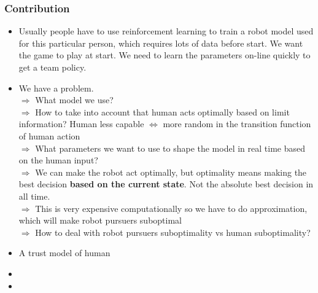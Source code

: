 \subsubsection{Contribution}
\begin{itemize}
    \item Usually people have to use reinforcement learning to train a robot model used for this particular person, which requires lots of data before start. We want the game to play at start. We need to learn the parameters on-line quickly to get a team policy.
    \item We have a problem.\\
    $\Rightarrow$ What model we use?\\
    $\Rightarrow$ How to take into account that human acts optimally based on limit information? Human less capable $\Leftrightarrow$ more random in the transition function of human action\\
    $\Rightarrow$ What parameters we want to use to shape the model in real time based on the human input?\\
    $\Rightarrow$ We can make the robot act optimally, but optimality means making the best decision \textbf{based on the current state}. Not the absolute best decision in all time.\\
    $\Rightarrow$ This is very expensive computationally so we have to do approximation, which will make robot pursuers suboptimal\\
    $\Rightarrow$ How to deal with robot pursuers suboptimality vs human suboptimality?
    \item A trust model of human
    \item {}
    \item {}
\end{itemize}

